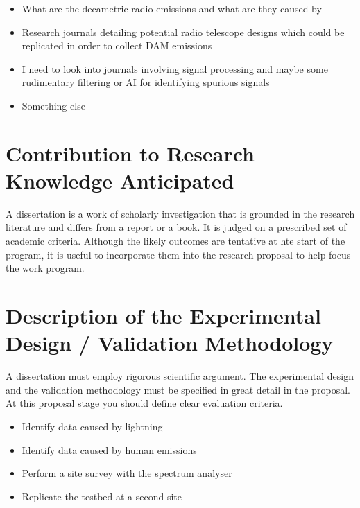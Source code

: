 \documentclass[runningheads,a4paper]{llncs}
\begin{document}
\begin{itemize}
  \item What are the decametric radio emissions and what are they caused by
  \item Research journals detailing potential radio telescope designs which could be replicated in order to collect DAM emissions
  \item I need to look into journals involving signal processing and maybe some rudimentary filtering or AI for identifying spurious signals
  \item Something else
  
\end{itemize}
%
%
\newpage
\section*{Contribution to Research Knowledge Anticipated}
%
A dissertation is a work of scholarly investigation that is grounded in the research literature and differs from a report or a book. It is judged on a prescribed set of academic criteria. Although the likely outcomes are tentative at hte start of the program, it is useful to incorporate them into the research proposal to help focus the work program.
%
%
\newpage
\section*{Description of the Experimental Design / Validation Methodology}
%
A dissertation must employ rigorous scientific argument. The experimental design and the validation methodology must be specified in great detail in the proposal. At this proposal stage you should define clear evaluation criteria.


\begin{itemize}
  \item Identify data caused by lightning
  \item Identify data caused by human emissions
  \item Perform a site survey with the spectrum analyser
  \item Replicate the testbed at a second site
\end{itemize}
%
%
\newpage
\end{document}
